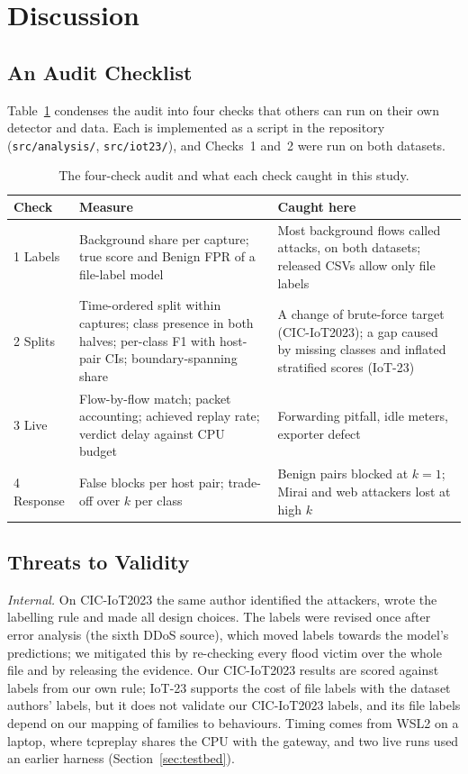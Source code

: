 \section{Discussion}\label{sec:discussion}

\subsection{An Audit Checklist}\label{sec:checklist}

Table~\ref{tab:checklist} condenses the audit into four checks that others can run on their own detector and data. Each is implemented as a script in the repository (\nolinkurl{src/analysis/}, \nolinkurl{src/iot23/}), and Checks~1 and~2 were run on both datasets.

\begin{table}[t]
\centering
\caption{The four-check audit and what each check caught in this study.}
\label{tab:checklist}
\footnotesize
\setlength{\tabcolsep}{3pt}
\begin{tabular}{p{1.0cm}p{3.5cm}p{3.6cm}}
\hline
Check & Measure & Caught here \\
\hline
1 Labels & Background share per capture; true score and Benign FPR of a file-label model & Most background flows called attacks, on both datasets; released CSVs allow only file labels \\
2 Splits & Time-ordered split within captures; class presence in both halves; per-class F1 with host-pair CIs; boundary-spanning share & A change of brute-force target (CIC-IoT2023); a gap caused by missing classes and inflated stratified scores (IoT-23) \\
3 Live & Flow-by-flow match; packet accounting; achieved replay rate; verdict delay against CPU budget & Forwarding pitfall, idle meters, exporter defect \\
4 Response & False blocks per host pair; trade-off over $k$ per class & Benign pairs blocked at $k=1$; Mirai and web attackers lost at high $k$ \\
\hline
\end{tabular}
\end{table}

\subsection{Threats to Validity}\label{sec:threats}

\emph{Internal.} On CIC-IoT2023 the same author identified the attackers, wrote the labelling rule and made all design choices. The labels were revised once after error analysis (the sixth DDoS source), which moved labels towards the model's predictions; we mitigated this by re-checking every flood victim over the whole file and by releasing the evidence. Our CIC-IoT2023 results are scored against labels from our own rule; IoT-23 supports the cost of file labels with the dataset authors' labels, but it does not validate our CIC-IoT2023 labels, and its file labels depend on our mapping of families to behaviours. Timing comes from WSL2 on a laptop, where tcpreplay shares the CPU with the gateway, and two live runs used an earlier harness (Section~\ref{sec:testbed}).

